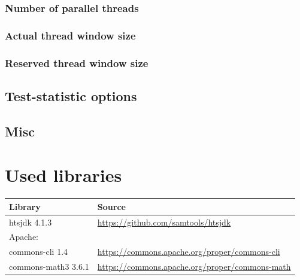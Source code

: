 \documentclass[10pt,a4paper,final]{article}
\begin{document}
\subsubsection{Number of parallel threads}

\subsubsection{Actual thread window size}

\subsubsection{Reserved thread window size}

\subsection{Test-statistic options}


\subsection{Misc}


\section{Used libraries}
{\small
  \begin{tabular}{ll}
    \textbf{Library}          & \textbf{Source} \\
    \hline
    htsjdk 4.1.3              & \url{https://github.com/samtools/htsjdk} \\
    Apache:                   & \\
    \quad commons-cli 1.4     & \url{https://commons.apache.org/proper/commons-cli} \\
    \quad commons-math3 3.6.1 & \url{https://commons.apache.org/proper/commons-math}\\
  \end{tabular}
}


\end{document}
